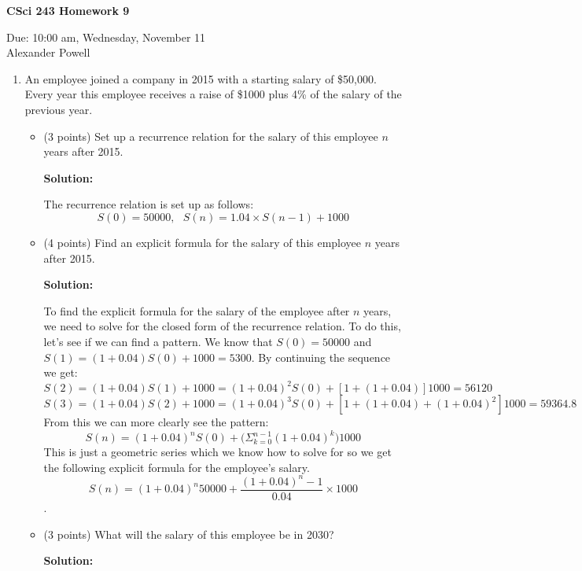 \documentclass[11pt]{article}
\begin{document}
\begin{center}             %
\begin{LARGE}
{\bf CSci 243 Homework 9}
\end{LARGE}
\vskip 0.25cm      %

Due: 10:00 am, Wednesday, November 11 \\  %
Alexander Powell    %
\end{center}

\begin{enumerate}
\item 
An employee joined a company in 2015 with a starting salary of \$50,000.
Every year this employee receives a raise of \$1000 plus 4\% of the 
salary of the previous year.
\begin{itemize}
\item (3 points) Set up a recurrence relation for the salary of 
	this employee $n$ years after 2015.

\textbf{Solution: }

The recurrence relation is set up as follows:
$$ S(0) = 50000, \text{ } S(n) = 1.04 \times S(n-1) + 1000 $$

\item (4 points) Find an explicit formula for the salary of this 
	employee $n$ years after 2015.

\textbf{Solution: }

To find the explicit formula for the salary of the employee after $n$ years, we need to solve for the closed form of the recurrence relation.  To do this, let's see if we can find a pattern.  We know that $S(0) = 50000$ and $S(1) = (1 + 0.04)S(0) + 1000 = 5300$.  
By continuing the sequence we get:
$$ S(2) = (1 + 0.04)S(1) + 1000 = (1+0.04)^2S(0) + [ 1 + (1 + 0.04) ] 1000 = 56120 $$
$$ S(3) = (1 + 0.04)S(2) + 1000 = (1+0.04)^3S(0) + [ 1 + (1 + 0.04) + (1 + 0.04)^2 ] 1000 = 59364.8 $$
From this we can more clearly see the pattern:
$$ S(n) = (1 + 0.04)^nS(0) + \bigg( \Sigma_{k=0}^{n-1} (1 + 0.04)^k \bigg) 1000 $$
This is just a geometric series which we know how to solve for so we get the following explicit formula for the employee's salary.  
$$ S(n) = (1 + 0.04)^n50000 + \dfrac{(1 + 0.04)^n - 1}{0.04} \times 1000 $$.  


\item (3 points) What will the salary of this employee be in 2030?

\textbf{Solution: }


\end{itemize}
\end{enumerate}
\end{document}
